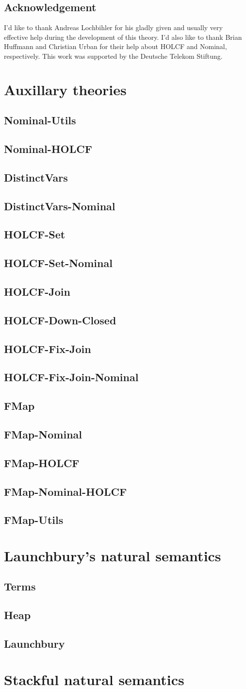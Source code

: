 \documentclass[11pt,a4paper,parskip=half]{scrartcl}
\begin{document}
\subsection{Acknowledgement}

I’d like to thank Andreas Lochbihler for his gladly given and usually very effective help during the development of this theory. I’d also like to thank Brian Huffmann and Christian Urban for their help about HOLCF and Nominal, respectively. This work was supported by the Deutsche Telekom Stiftung.

\clearpage
\newcommand{\theory}[1]{\subsection{#1}\label{sec_#1}}

\section{Auxillary theories}

\label{ch_aux}

\theory{Nominal-Utils}


\theory{Nominal-HOLCF}

\theory{DistinctVars}

\theory{DistinctVars-Nominal}

\theory{HOLCF-Set}

\theory{HOLCF-Set-Nominal}

\theory{HOLCF-Join}

\theory{HOLCF-Down-Closed}

\theory{HOLCF-Fix-Join}

\theory{HOLCF-Fix-Join-Nominal}

\theory{FMap}

\theory{FMap-Nominal}

\theory{FMap-HOLCF}

\theory{FMap-Nominal-HOLCF}

\theory{FMap-Utils}

\clearpage
\section{Launchbury's natural semantics}
\label{ch_natsem}

\theory{Terms}
\theory{Heap}

\theory{Launchbury}

\clearpage
\section{Stackful natural semantics}
\label{ch_natsemstack}
\end{document}
